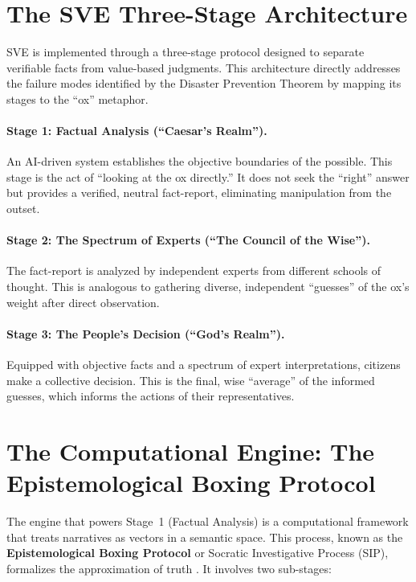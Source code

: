 \documentclass[11pt,a4paper]{article}
\theoremstyle{definition}
\begin{document}
\section{The SVE Three-Stage Architecture}

SVE is implemented through a three-stage protocol designed to separate verifiable facts from value-based judgments. This architecture directly addresses the failure modes identified by the Disaster Prevention Theorem by mapping its stages to the ``ox'' metaphor.

\paragraph{Stage 1: Factual Analysis (``Caesar's Realm'').} An AI-driven system establishes the objective boundaries of the possible. This stage is the act of ``looking at the ox directly.'' It does not seek the ``right'' answer but provides a verified, neutral fact-report, eliminating manipulation from the outset.

\paragraph{Stage 2: The Spectrum of Experts (``The Council of the Wise'').} The fact-report is analyzed by independent experts from different schools of thought. This is analogous to gathering diverse, independent ``guesses'' of the ox's weight after direct observation.

\paragraph{Stage 3: The People's Decision (``God's Realm'').} Equipped with objective facts and a spectrum of expert interpretations, citizens make a collective decision. This is the final, wise ``average'' of the informed guesses, which informs the actions of their representatives.

\section{The Computational Engine: The Epistemological Boxing Protocol}

The engine that powers Stage~1 (Factual Analysis) is a computational framework that treats narratives as vectors in a semantic space. This process, known as the \textbf{Epistemological Boxing Protocol} or Socratic Investigative Process (SIP), formalizes the approximation of truth \citep{Kovnatsky2025SIP}. It involves two sub-stages:
\end{document}
